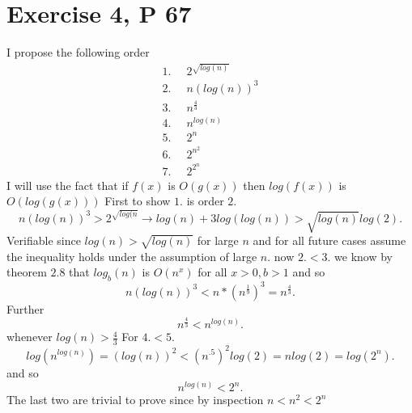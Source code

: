 \documentclass{amsart}
\begin{document}
\section{Exercise 4, P 67}
I propose the following order
\begin{align*}
    1.\;\;& 2^{\sqrt{log(n)}}\\
    2.\;\;& n(log(n))^{3}\\
    3.\;\;& n^{\frac{4}{3}}\\
    4.\;\;& n^{log(n)}\\
    5.\;\;& 2^{n}\\
    6.\;\;& 2^{n^2}\\
    7.\;\;& 2^{2^{n}}
\end{align*}
I will use the fact that if $f(x)$ is $O(g(x))$ then $log(f(x))$ is $O(log(g(x)))$
First to show  $1.$ is order $2.$ 
\[
n(log(n))^{3} > 2^{\sqrt{log(n}} \rightarrow log(n) + 3log(log(n)) > \sqrt{log(n)}log(2)
.\] 
Verifiable since $log(n) > \sqrt{log(n)}$ for large $n$ and for all future cases assume the inequality holds under the assumption of large $n$.
now $2. < 3.$ 
we know by theorem $2.8$ that $log_b(n) $ is $O(n^x)$ for all $x > 0, b > 1$ and so
\[
n(log(n))^{3} < n * (n^{\frac{1}{9}})^{3} = n^{\frac{4}{3}}
.\] 
Further
\[
n^{\frac{4}{3}} < n^{log(n)}
.\] 
whenever $log(n) > \frac{4}{3}$
For $4. <  5.$
\[
    log(n^{log(n)}) = (log(n))^2 < (n^{.5})^2 log(2) = nlog(2) = log(2^{n})
.\] 
and so
\[
n^{log(n)} < 2^{n}
.\] 
The last two are trivial to prove since by inspection $n < n^2 < 2^{n}$
\end{document}
